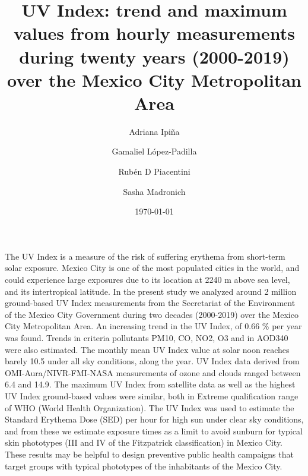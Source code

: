 \documentclass[10pt]{article}
\renewenvironment{abstract}
  {{\bfseries\noindent{\abstractname}\par\nobreak}\footnotesize}
  {\bigskip}
\begin{document}
\title{UV Index: trend and maximum values from hourly measurements during
twenty years (2000-2019) over the Mexico City Metropolitan Area}


\author[1]{Adriana Ipiña}%
\author[2]{Gamaliel López-Padilla}%
\author[1]{Rubén D Piacentini}%
\author[3]{Sasha Madronich}
%
%


\vspace{-1em}



  \date{\today}


\begingroup
\let\center\flushleft
\let\endcenter\endflushleft
\maketitle
\endgroup





\begin{abstract}
  The UV Index is a measure of the risk of suffering erythema from short-term solar exposure. Mexico City is one of the most populated cities in the world, and could experience large exposures due to its location at 2240 m above sea level, and its intertropical latitude. In the present study we analyzed around 2 million ground-based UV Index measurements from the Secretariat of the Environment of the Mexico City Government during two decades (2000-2019) over the Mexico City Metropolitan Area. An increasing trend in the UV Index, of 0.66 \% per year was found. Trends in criteria pollutants PM10, CO, NO2, O3 and in AOD340 were also estimated. The monthly mean UV Index value at solar noon reaches barely 10.5 under all sky conditions, along the year. UV Index data derived from OMI-Aura/NIVR-FMI-NASA measurements of ozone and clouds ranged between 6.4 and 14.9. The maximum UV Index from satellite data as well as the highest UV Index ground-based values were similar, both in Extreme qualification range of WHO (World Health Organization). The UV Index was used to estimate the Standard Erythema Dose (SED) per hour for high sun under clear sky conditions, and from these we estimate exposure times as a limit to avoid sunburn for typical skin phototypes (III and IV of the Fitzpatrick classification) in Mexico City. These results may be helpful to design preventive public health campaigns that target groups with typical phototypes of the inhabitants of the Mexico City.
\end{abstract}%
\end{document}
